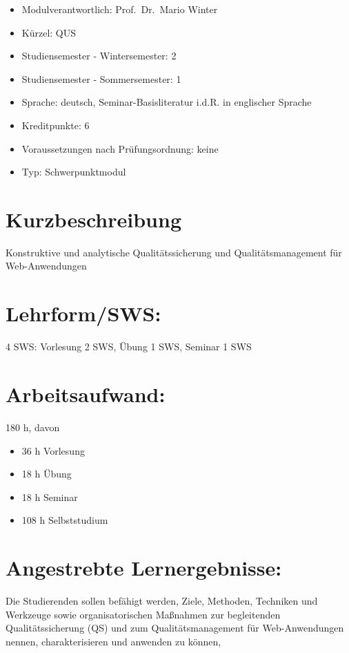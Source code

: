 \begin{itemize}
\tightlist
\item
  Modulverantwortlich: Prof.~Dr.~Mario Winter
\item
  Kürzel: QUS
\item
  Studiensemester - Wintersemester: 2
\item
  Studiensemester - Sommersemester: 1
\item
  Sprache: deutsch, Seminar-Basisliteratur i.d.R. in englischer Sprache
\item
  Kreditpunkte: 6
\item
  Voraussetzungen nach Prüfungsordnung: keine
\item
  Typ: Schwerpunktmodul
\end{itemize}

\section*{Kurzbeschreibung}\label{kurzbeschreibung-11}

Konstruktive und analytische Qualitätssicherung und Qualitätsmanagement
für Web-Anwendungen

\section*{Lehrform/SWS:}\label{lehrformsws-21}

4 SWS: Vorlesung 2 SWS, Übung 1 SWS, Seminar 1 SWS

\section*{Arbeitsaufwand:}\label{arbeitsaufwand-27}

180 h, davon

\begin{itemize}
\tightlist
\item
  36 h Vorlesung
\item
  18 h Übung
\item
  18 h Seminar
\item
  108 h Selbststudium
\end{itemize}

\section*{Angestrebte
Lernergebnisse:}\label{angestrebte-lernergebnisse-21}

Die Studierenden sollen befähigt werden, Ziele, Methoden, Techniken und
Werkzeuge sowie organisatorischen Maßnahmen zur begleitenden
Qualitätssicherung (QS) und zum Qualitätsmanagement für Web-Anwendungen
nennen, charakterisieren und anwenden zu können,


